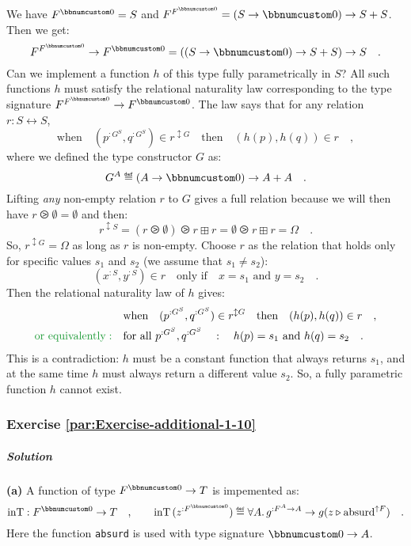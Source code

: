 We have $F^{\bbnum 0}=S$ and $F^{F^{\bbnum 0}}=(S\rightarrow\bbnum 0)\rightarrow S+S$.
Then we get:
\[
F^{F^{\bbnum 0}}\rightarrow F^{\bbnum 0}=((S\rightarrow\bbnum 0)\rightarrow S+S)\rightarrow S\quad.
\]
Can we implement a function $h$ of this type fully parametrically
in $S$? All such functions $h$ must satisfy the relational naturality
law corresponding to the type signature $F^{F^{\bbnum 0}}\rightarrow F^{\bbnum 0}$.
The law says that for any relation $r:S\leftrightarrow S$,
\[
\text{when}\quad(p^{:G^{S}},q^{:G^{S}})\in r^{\updownarrow G}\quad\text{then}\quad(h(p),h(q))\in r\quad,
\]
where we defined the type constructor $G$ as:
\[
G^{A}\triangleq(A\rightarrow\bbnum 0)\rightarrow A+A\quad.
\]
Lifting \emph{any} non-empty relation $r$ to $G$ gives a full relation
because we will then have $r\ogreaterthan\emptyset=\emptyset$ and
then:
\[
r^{\updownarrow S}=(r\ogreaterthan\emptyset)\ogreaterthan r\boxplus r=\emptyset\ogreaterthan r\boxplus r=\Omega\quad.
\]
 So, $r^{\updownarrow G}=\Omega$ as long as $r$ is non-empty. Choose
$r$ as the relation that holds only for specific values $s_{1}$
and $s_{2}$ (we assume that $s_{1}\neq s_{2}$):
\[
(x^{:S},y^{:S})\in r\quad\text{only if}\quad x=s_{1}\text{ and }y=s_{2}\quad.
\]
Then the relational naturality law of $h$ gives:
\begin{align*}
 & \text{when}\quad(p^{:G^{S}},q^{:G^{S}})\in r^{\updownarrow G}\quad\text{then}\quad(h(p),h(q))\in r\quad,\\
{\color{greenunder}\text{or equivalently}:}\quad & \text{for all }p^{:G^{S}},q^{:G^{S}}\quad:\quad h(p)=s_{1}\text{ and }h(q)=s_{2}\quad.
\end{align*}
This is a contradiction: $h$ must be a constant function that always
returns $s_{1}$, and at the same time $h$ must always return a different
value $s_{2}$. So, a fully parametric function $h$ cannot exist.

\subsubsection*{Exercise \ref{par:Exercise-additional-1-10}}

\subparagraph{Solution}

\textbf{(a)} A function of type $F^{\bbnum 0}\rightarrow T$ is impemented
as:
\[
\text{inT}:F^{\bbnum 0}\rightarrow T\quad,\quad\quad\text{inT}\,(z^{:F^{\bbnum 0}})\triangleq\forall A.\,g^{:F^{A}\rightarrow A}\rightarrow g(z\triangleright\text{absurd}^{\uparrow F})\quad.
\]
Here the function \lstinline!absurd! is used with type signature
$\bbnum 0\rightarrow A$.

